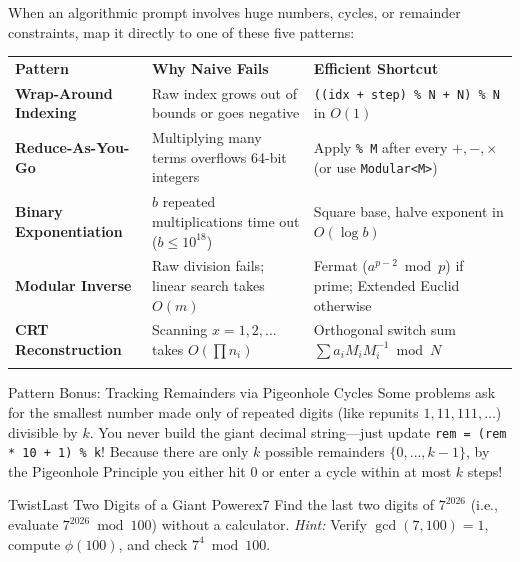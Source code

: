 \documentclass[11pt,a4paper]{article}
\theoremstyle{definition}
\begin{document}
When an algorithmic prompt involves huge numbers, cycles, or remainder constraints, map it directly to one of these five patterns:

\begingroup\small{}
\begin{tabularx}{\textwidth}{>{\raggedright\arraybackslash\bfseries}p{3.4cm} >{\raggedright\arraybackslash}p{4.8cm} >{\raggedright\arraybackslash}X}
\arrayrulecolor{primaryblue}\toprule[1.2pt]
\rowcolor{primaryblue!10}
\textcolor{primaryblue}{\textbf{Pattern}} & \textcolor{primaryblue}{\textbf{Why Naive Fails}} & \textcolor{primaryblue}{\textbf{Efficient Shortcut}} \\
\arrayrulecolor{codeframe}\midrule[0.6pt]
Wrap-Around Indexing & Raw index grows out of bounds or goes negative & \texttt{((idx + step) \% N + N) \% N} in $O(1)$ \\
Reduce-As-You-Go & Multiplying many terms overflows 64-bit integers & Apply \texttt{\% M} after every $+, -, \times$ (or use \texttt{Modular<M>}) \\
Binary Exponentiation & $b$ repeated multiplications time out ($b \le 10^{18}$) & Square base, halve exponent in $O(\log b)$ \\
Modular Inverse & Raw division fails; linear search takes $O(m)$ & Fermat ($a^{p-2} \bmod p$) if prime; Extended Euclid otherwise \\
CRT Reconstruction & Scanning $x = 1, 2, \dots$ takes $O(\prod n_i)$ & Orthogonal switch sum $\sum a_i M_i M_i^{-1} \bmod N$ \\
\arrayrulecolor{primaryblue}\bottomrule[1.2pt]
\end{tabularx}\endgroup

\begin{calloutbox}{Pattern Bonus: Tracking Remainders via Pigeonhole Cycles}
Some problems ask for the smallest number made only of repeated digits (like repunits $1, 11, 111, \dots$) divisible by $k$. You never build the giant decimal string---just update \texttt{rem = (rem * 10 + 1) \% k}! Because there are only $k$ possible remainders $\{0, \dots, k - 1\}$, by the Pigeonhole Principle you either hit $0$ or enter a cycle within at most $k$ steps!
\end{calloutbox}

\begin{tryitbox}{Twist}{Last Two Digits of a Giant Power}{ex7}
Find the last two digits of $7^{2026}$ (i.e., evaluate $7^{2026} \bmod 100$) without a calculator.
\emph{Hint:} Verify $\gcd(7, 100) = 1$, compute $\phi(100)$, and check $7^4 \bmod 100$.
\end{tryitbox}
\end{document}
